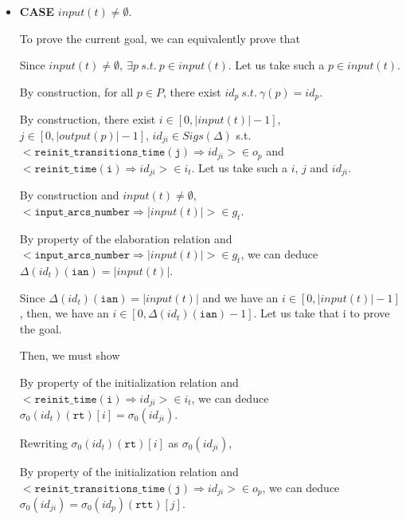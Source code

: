 \documentclass[dvipsnames,12pt]{article}
\begin{document}
\begin{niproof}
\begin{itemize}
  \item \textbf{CASE} $input(t)\neq\emptyset$.

    To prove the current goal, we can equivalently prove that\\

    Since $input(t)\neq\emptyset,~\exists{}p~s.t.~p\in{}input(t)$. Let
    us take such a $p\in{}input(t)$.
    
    By construction, for all $p\in{}P$, there exist
    $id_p~s.t.~\gamma(p)=id_p$.

    \exP{}

    \noindent{}By construction, there exist
    $i\in[0,\vert{}input(t)\vert{}-1]$,
    $j\in[0,\vert{}output(p)\vert{}-1]$, $id_{ji}\in{}Sigs(\Delta)$
    s.t.
    ${<}\mathtt{reinit\_transitions\_time(j)\Rightarrow}id_{ji}{>}\in{}o_p$
    and
    ${<}\mathtt{reinit\_time(i)\Rightarrow}id_{ji}{>}\in{}i_t$. Let us take such a $i$, $j$ and $id_{ji}$.

    By construction and $input(t)\neq\emptyset$,
    ${<}\mathtt{input\_arcs\_number\Rightarrow}\vert{}input(t)\vert{}{>}\in{}g_t$.

    By property of the \hvhdl{} elaboration relation and
    ${<}\mathtt{input\_arcs\_number\Rightarrow}\vert{}input(t)\vert{}{>}\in{}g_t$,
    we can deduce $\Delta(id_t)(\texttt{ian})=\vert{}input(t)\vert$.

    Since $\Delta(id_t)(\texttt{ian})=\vert{}input(t)\vert$ and we have an
    $i\in[0,\vert{}input(t)\vert-1]$, then, we have an
    $i\in[0, \Delta(id_t)(\texttt{ian})-1]$. Let us take that i to
    prove the goal.

    Then, we must show 

    By property of the \hvhdl{} initialization relation and
    ${<}\mathtt{reinit\_time(i)\Rightarrow}id_{ji}{>}\in{}i_t$, we can
    deduce $\sigma_0(id_t)(\texttt{rt})[i]=\sigma_0(id_{ji})$.

    Rewriting $\sigma_0(id_t)(\texttt{rt})[i]$ as $\sigma_0(id_{ji})$,

    By property of the \hvhdl{} initialization relation and\\
    ${<}\mathtt{reinit\_transitions\_time(j)\Rightarrow}id_{ji}{>}\in{}o_p$,
    we can deduce
    $\sigma_0(id_{ji})=\sigma_0(id_p)(\texttt{rtt})[j]$.


\end{itemize}
\end{niproof}
\end{document}
